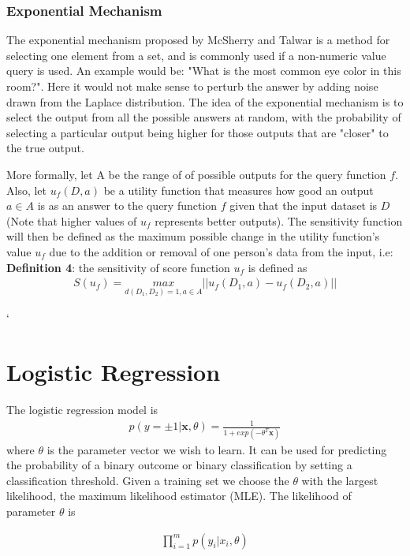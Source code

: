 \subsubsection{Exponential Mechanism}
The exponential mechanism proposed by McSherry and Talwar \cite{mcsherry2007} is a method for selecting one element from a set, and is commonly used if a non-numeric value query is used. An example would be: "What is the most common eye color in this room?". Here it would not make sense to perturb the answer by adding noise drawn from the Laplace distribution. The idea of the exponential mechanism is to select the output from all the possible answers at random, with the probability of selecting a particular output being higher for those outputs that are "closer" to the true output. 

More formally, let A be the range of of possible outputs for the query function $f$. Also, let $u_f(D,a)$ be a utility function that measures how good an output $a\in A$ is as an answer to the query function $f$ given that the input dataset is $D$ (Note that higher values of $u_f$ represents better outputs). The sensitivity function will then be defined as the maximum possible change in the utility function's value $u_f$ due to the addition or removal of one person's data from the input, i.e: \newline
\textbf{Definition 4}: the sensitivity of score function $u_f$ is defined as
\begin{eqnarray} \label{ExpoMecDef}
S(u_f) = \underset{d(D_1,D_2)=1,a\in A}{max}||u_f(D_1, a)-u_f(D_2,a)||
 \end{eqnarray}
 
 `
 \section{Logistic Regression}

 
 The logistic regression model is
  \begin{eqnarray} 
 p(y = ±1|\textbf{x}, \theta) = \frac{1}{1 + exp( - \theta^T \textbf{x})}
  \end{eqnarray}
  where $\theta$ is the parameter vector we wish to learn.
 It can be used for predicting the probability of a binary outcome or binary classification by setting a classification threshold. Given a training set we choose the $\theta$ with the largest likelihood, the maximum likelihood estimator (MLE)\cite{elkan2014logreg}. The likelihood of parameter $\theta$ is
 
   \begin{eqnarray}
   \prod_{i=1}^{m} p(y_i | x_i,\theta)
   \end{eqnarray}
   
